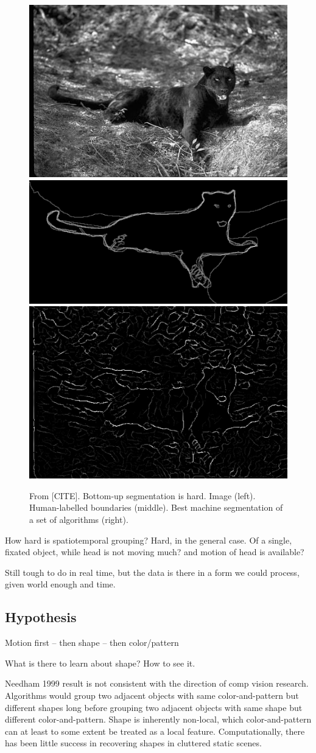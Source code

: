 \begin{figure}

\centerline{
\includegraphics[width=0.3\columnwidth]{cat}
\includegraphics[width=0.3\columnwidth]{cat-human}
\includegraphics[width=0.3\columnwidth]{cat-machine}
}

\caption{
From [CITE].  Bottom-up segmentation is hard.
Image (left).  Human-labelled boundaries (middle).
Best machine segmentation of a set of algorithms (right).
}

\end{figure}

\cite{martin01database}

How hard is spatiotemporal grouping?
Hard, in the general case.
Of a single, fixated object, while head is not moving much?  and
motion of head is available?

Still tough to do in real time, but the data is there in a form
we could process, given world enough and time.



\subsection{Hypothesis}

Motion first -- then shape -- then color/pattern

What is there to learn about shape?  How to see it.

Needham 1999 result is not consistent with the direction of comp
vision research.  Algorithms would group two adjacent objects with
same color-and-pattern but different shapes long before grouping two
adjacent objects with same shape but different color-and-pattern.
Shape is inherently non-local, which color-and-pattern 
can at least to some extent be treated as a local feature.
Computationally, there 
has been little success in recovering shapes in cluttered static scenes.

